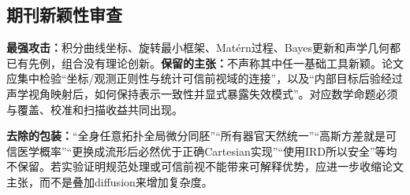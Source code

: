 \documentclass[UTF8,11pt,a4paper,fontset=fandol]{ctexart}
\numberwithin{equation}{section}
\theoremstyle{plain}
\theoremstyle{definition}
\theoremstyle{remark}
\begin{document}
\subsection{期刊新颖性审查}
\textbf{最强攻击：}积分曲线坐标、旋转最小框架、Mat\'ern过程、Bayes更新和声学几何都已有先例，组合没有理论创新。\textbf{保留的主张：}不声称其中任一基础工具新颖。论文应集中检验“坐标/观测正则性与统计可信前视域的连接”，以及“内部目标后验经过声学视角映射后，如何保持表示一致性并显式暴露失效模式”。对应数学命题必须与覆盖、校准和扫描收益共同出现。

\textbf{去除的包装：}“全身任意拓扑全局微分同胚”“所有器官天然统一”“高斯方差就是可信医学概率”“更换成流形后必然优于正确Cartesian实现”“使用IRD所以安全”等均不保留。若实验证明规范处理或可信前视不能带来可解释优势，应进一步收缩论文主张，而不是叠加diffusion来增加复杂度。
\end{document}
